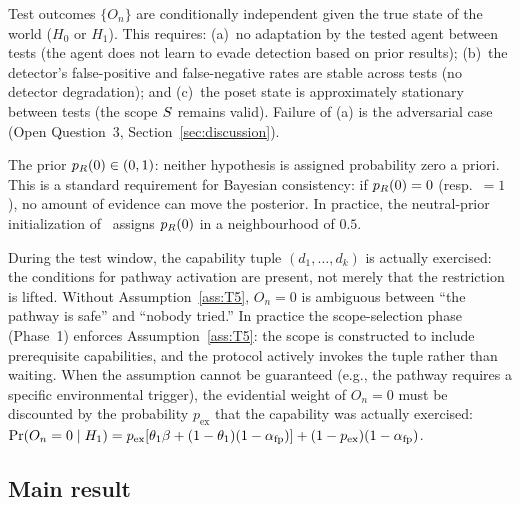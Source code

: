 \begin{assumption}
\label{ass:T3}
Test outcomes $\{O_n\}$ are conditionally independent given the
true state of the world ($H_0$ or $H_1$).  This requires:
(a)~no adaptation by the tested agent between tests (the agent
does not learn to evade detection based on prior results);
(b)~the detector's false-positive and false-negative rates are
stable across tests (no detector degradation); and (c)~the
poset state is approximately stationary between tests (the
scope $S$ remains valid).  Failure of (a) is the
adversarial case (Open Question~3,
Section~\ref{sec:discussion}).
\end{assumption}

\begin{assumption}
\label{ass:T4}
The prior $p_R(0) \in (0, 1)$: neither hypothesis is assigned
probability zero a priori.  This is a standard requirement for
Bayesian consistency: if $p_R(0) = 0$ (resp.\ $= 1$), no amount
of evidence can move the posterior.  In practice, the
neutral-prior initialization of~\citep{lasser2026horizon}
assigns $p_R(0)$ in a neighbourhood of $0.5$.
\end{assumption}

\begin{assumption}
\label{ass:T5}
During the test window, the capability tuple
$(d_1, \ldots, d_k)$ is actually exercised: the conditions for
pathway activation are present, not merely that the restriction
is lifted.  Without Assumption~\ref{ass:T5}, $O_n = 0$ is
ambiguous between ``the pathway is safe'' and ``nobody tried.''
In practice the scope-selection phase (Phase~1) enforces
Assumption~\ref{ass:T5}: the scope is constructed to include
prerequisite capabilities, and the protocol actively invokes
the tuple rather than waiting.  When the assumption cannot be
guaranteed (e.g., the pathway requires a specific environmental
trigger), the evidential weight of $O_n = 0$ must be discounted
by the probability $p_{\mathrm{ex}}$ that the capability was
actually exercised:
$\Pr(O_n = 0 \mid H_1)
   = p_{\mathrm{ex}} [\theta_1 \beta + (1 - \theta_1)(1 - \alpha_{\mathrm{fp}})]
     + (1 - p_{\mathrm{ex}})(1 - \alpha_{\mathrm{fp}})$.
\end{assumption}

\subsection{Main result}

